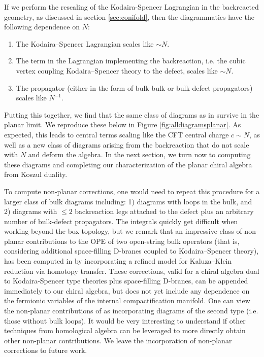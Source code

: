 \documentclass[../main.tex]{subfiles}
\begin{document}
If we perform the rescaling of the Kodaira-Spencer Lagrangian in the backreacted geometry, as discussed in section \ref{sec:conifold}, then the diagrammatics have the following dependence on $N$: 
\begin{enumerate}
\item The Kodaira--Spencer Lagrangian scales like $\sim N$. \\
\item The term in the Lagrangian implementing the backreaction, i.e. the cubic vertex coupling Kodaira--Spencer theory to the defect, scales like $\sim N$. \\
\item The propagator (either in the form of bulk-bulk or bulk-defect propagators) scales like $N^{-1}$.
\end{enumerate}

Putting this together, we find that the same class of diagrams as in \cite{CP} survive in the planar limit. We reproduce these below in Figure \ref{fig:alldiagramsplanar}. As expected, this leads to central terms scaling like the CFT central charge $c \sim N$, as well as a new class of diagrams arising from the backreaction that do not scale with $N$ and deform the algebra. 
In the next section, we turn now to computing these diagrams and completing our characterization of the planar chiral algebra from Koszul duality. 

To compute non-planar corrections, one would need to repeat this procedure for a larger class of bulk diagrams including: 1) diagrams with loops in the bulk, and 2) diagrams with $\leq 2$ backreaction legs attached to the defect plus an arbitrary number of bulk-defect propagators. The integrals quickly get difficult when working beyond the box topology, but we remark that an impressive class of non-planar contributions to the OPE of two open-string bulk operators (that is, considering additional space-filling D-branes coupled to Kodaira--Spencer theory), has been computed in \cite{Keyou} by incorporating a refined model for Kaluza--Klein reduction via homotopy transfer.
These corrections, valid for a chiral algebra dual to Kodaira-Spencer type theories plus space-filling D-branes, can be appended immediately to our chiral algebra, but does not yet include any dependence on the fermionic variables of the internal compactification manifold. 
One can view the non-planar contributions of \cite{Keyou} as incorporating diagrams of the second type (i.e. those without bulk loops). 
It would be very interesting to understand if other techniques from homological algebra can be leveraged to more directly obtain other non-planar contributions. We leave the incorporation of non-planar corrections to future work.
\end{document}
